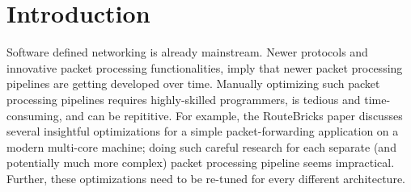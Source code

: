 \section{Introduction}

Software defined networking is already mainstream. Newer protocols and innovative packet
processing functionalities, imply that
newer packet processing pipelines are getting developed over time. Manually
optimizing such packet processing pipelines requires highly-skilled programmers, is tedious
and time-consuming, and can be repititive.
For example, the RouteBricks paper \cite{routebricks} discusses several insightful optimizations
for a simple packet-forwarding application on a modern multi-core machine; doing such careful
research for each separate (and potentially much more complex) packet processing pipeline
seems impractical. Further, these optimizations need to be re-tuned for every different
architecture.


